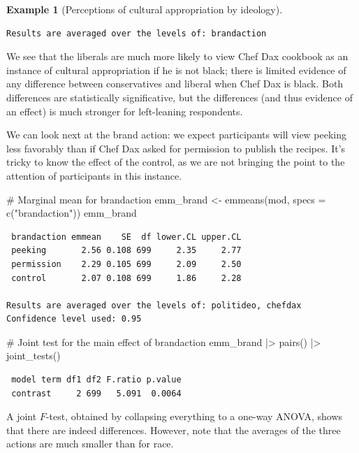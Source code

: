 \documentclass[
  11pt,
  letterpaper,
]{scrbook}
\newenvironment{Shaded}{\begin{snugshade}}{\end{snugshade}}
\newcommand{\AttributeTok}[1]{\textcolor[rgb]{0.40,0.45,0.13}{#1}}
\newcommand{\CommentTok}[1]{\textcolor[rgb]{0.37,0.37,0.37}{#1}}
\newcommand{\FunctionTok}[1]{\textcolor[rgb]{0.28,0.35,0.67}{#1}}
\newcommand{\NormalTok}[1]{\textcolor[rgb]{0.00,0.23,0.31}{#1}}
\newcommand{\OtherTok}[1]{\textcolor[rgb]{0.00,0.23,0.31}{#1}}
\newcommand{\SpecialCharTok}[1]{\textcolor[rgb]{0.37,0.37,0.37}{#1}}
\newcommand{\StringTok}[1]{\textcolor[rgb]{0.13,0.47,0.30}{#1}}
\theoremstyle{definition}
\newtheorem{example}{Example}[chapter]
\theoremstyle{remark}
\begin{document}
\begin{example}[Perceptions of cultural appropriation by
ideology]
\begin{verbatim}
Results are averaged over the levels of: brandaction 
\end{verbatim}

We see that the liberals are much more likely to view Chef Dax cookbook
as an instance of cultural appropriation if he is not black; there is
limited evidence of any difference between conservatives and liberal
when Chef Dax is black. Both differences are statistically
significative, but the differences (and thus evidence of an effect) is
much stronger for left-leaning respondents.

We can look next at the brand action: we expect participants will view
peeking less favorably than if Chef Dax asked for permission to publish
the recipes. It's tricky to know the effect of the control, as we are
not bringing the point to the attention of participants in this
instance.

\begin{Shaded}
\begin{Highlighting}[]
\CommentTok{\# Marginal mean for brandaction}
\NormalTok{emm\_brand }\OtherTok{\textless{}{-}} \FunctionTok{emmeans}\NormalTok{(mod, }\AttributeTok{specs =} \FunctionTok{c}\NormalTok{(}\StringTok{"brandaction"}\NormalTok{)) }
\NormalTok{emm\_brand}
\end{Highlighting}
\end{Shaded}

\begin{verbatim}
 brandaction emmean    SE  df lower.CL upper.CL
 peeking       2.56 0.108 699     2.35     2.77
 permission    2.29 0.105 699     2.09     2.50
 control       2.07 0.108 699     1.86     2.28

Results are averaged over the levels of: politideo, chefdax 
Confidence level used: 0.95 
\end{verbatim}

\begin{Shaded}
\begin{Highlighting}[]
\CommentTok{\# Joint test for the main effect of brandaction}
\NormalTok{emm\_brand }\SpecialCharTok{|\textgreater{}} \FunctionTok{pairs}\NormalTok{() }\SpecialCharTok{|\textgreater{}} \FunctionTok{joint\_tests}\NormalTok{()}
\end{Highlighting}
\end{Shaded}

\begin{verbatim}
 model term df1 df2 F.ratio p.value
 contrast     2 699   5.091  0.0064
\end{verbatim}

A joint \(F\)-test, obtained by collapsing everything to a one-way
ANOVA, shows that there are indeed differences. However, note that the
averages of the three actions are much smaller than for race.

\end{example}
\end{document}
